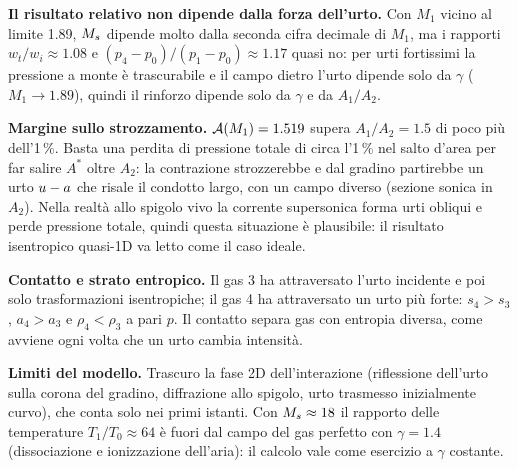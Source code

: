 \textbf{Il risultato relativo non dipende dalla forza dell'urto.} Con $M_1$ vicino al limite \num{1.89}, $M_{s}$ dipende
molto dalla seconda cifra decimale di $M_1$, ma i rapporti $w_t/w_i\approx\num{1.08}$ e
$(p_4-p_0)/(p_1-p_0)\approx\num{1.17}$ quasi no: per urti fortissimi la pressione a monte è trascurabile e il campo
dietro l'urto dipende solo da $\gamma$ ($M_1\to\num{1.89}$), quindi il rinforzo dipende solo da $\gamma$ e da $A_1/A_2$.

\textbf{Margine sullo strozzamento.} $\mathcal{A}(M_1)=\num{1.519}$ supera $A_1/A_2=\num{1.5}$ di poco più dell'1\,\%. Basta una
perdita di pressione totale di circa l'1\,\% nel salto d'area per far salire $A^*$ oltre $A_2$: la contrazione
strozzerebbe e dal gradino partirebbe un urto $u-a$ che risale il condotto largo, con un campo diverso (sezione
sonica in $A_2$). Nella realtà allo spigolo vivo la corrente supersonica forma urti obliqui e perde pressione totale,
quindi questa situazione è plausibile: il risultato isentropico quasi-1D va letto come il caso ideale.

\textbf{Contatto e strato entropico.} Il gas 3 ha attraversato l'urto incidente e poi solo trasformazioni
isentropiche; il gas 4 ha attraversato un urto più forte: $s_4>s_3$, $a_4>a_3$ e $\rho_4<\rho_3$ a pari $p$. Il contatto
separa gas con entropia diversa, come avviene ogni volta che un urto cambia intensità.

\textbf{Limiti del modello.} Trascuro la fase 2D dell'interazione (riflessione dell'urto sulla corona del gradino,
diffrazione allo spigolo, urto trasmesso inizialmente curvo), che conta solo nei primi istanti. Con $M_{s}\approx18$ il
rapporto delle temperature $T_1/T_0\approx64$ è fuori dal campo del gas perfetto con $\gamma=\num{1.4}$
(dissociazione e ionizzazione dell'aria): il calcolo vale come esercizio a $\gamma$ costante.


